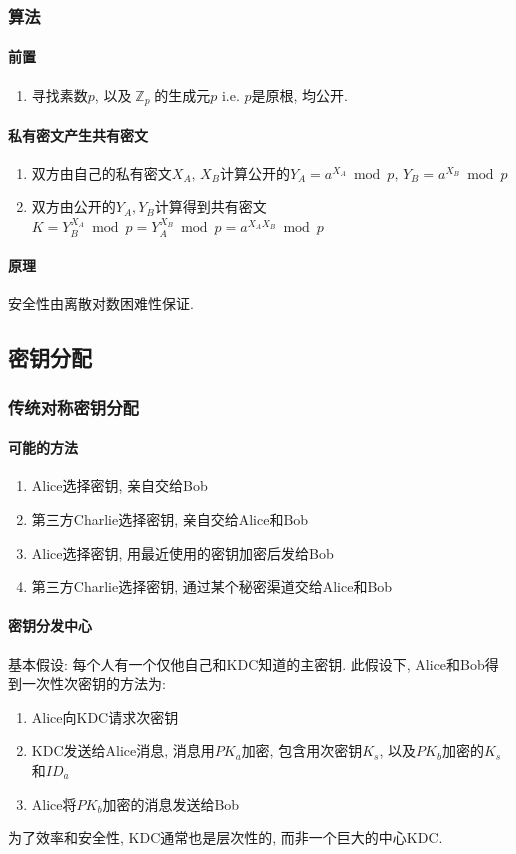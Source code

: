 \documentclass{ctexart}
\DeclareMathOperator{\Zset}{\mathbb{Z}}
\begin{document}
\subsubsection{算法}
\paragraph{前置}
    \begin{enumerate}
        \item 寻找素数$p$, 以及$\Zset_p$的生成元$p$ i.e. $p$是原根, 均公开.
    \end{enumerate}
\paragraph{私有密文产生共有密文}
    \begin{enumerate}
        \item 双方由自己的私有密文$X_A,\, X_B$计算公开的$Y_A = a^{X_A} \bmod p,\, Y_B = a^{X_B} \bmod p$
        \item 双方由公开的$Y_A, Y_B$计算得到共有密文$K = Y_B^{X_A} \bmod p = Y_A^{X_B} \bmod p = a^{X_A X_B} \bmod p$
    \end{enumerate}
\paragraph{原理}
    安全性由离散对数困难性保证.

\subsection{密钥分配}
\subsubsection{传统对称密钥分配}
\paragraph{可能的方法}
    \begin{enumerate}
        \item Alice选择密钥, 亲自交给Bob
        \item 第三方Charlie选择密钥, 亲自交给Alice和Bob
        \item Alice选择密钥, 用最近使用的密钥加密后发给Bob
        \item 第三方Charlie选择密钥, 通过某个秘密渠道交给Alice和Bob
    \end{enumerate}
\paragraph{密钥分发中心}
    基本假设: 每个人有一个仅他自己和KDC知道的主密钥. 此假设下, Alice和Bob得到一次性次密钥的方法为:
    \begin{enumerate}
        \item Alice向KDC请求次密钥
        \item KDC发送给Alice消息, 消息用$PK_a$加密, 包含用次密钥$K_s$, 以及$PK_b$加密的$K_s$和$ID_a$
        \item Alice将$PK_b$加密的消息发送给Bob
    \end{enumerate}
    为了效率和安全性, KDC通常也是层次性的, 而非一个巨大的中心KDC.
\end{document}
